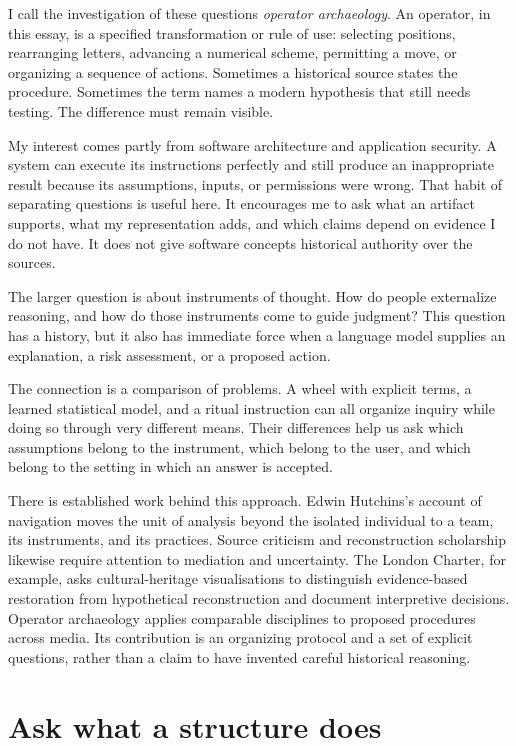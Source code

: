 \documentclass[11pt]{article}
\begin{document}
I call the investigation of these questions \emph{operator archaeology}.
An operator, in this essay, is a specified transformation or rule of use:
selecting positions, rearranging letters, advancing a numerical scheme,
permitting a move, or organizing a sequence of actions. Sometimes a historical
source states the procedure. Sometimes the term names a modern hypothesis
that still needs testing. The difference must remain visible.

My interest comes partly from software architecture and application security.
A system can execute its instructions perfectly and still produce an
inappropriate result because its assumptions, inputs, or permissions were
wrong. That habit of separating questions is useful here. It encourages me to
ask what an artifact supports, what my representation adds, and which claims
depend on evidence I do not have. It does not give software concepts historical
authority over the sources.

The larger question is about instruments of thought. How do people externalize
reasoning, and how do those instruments come to guide judgment? This question
has a history, but it also has immediate force when a language model supplies
an explanation, a risk assessment, or a proposed action.

The connection is a comparison of problems. A wheel with explicit terms, a
learned statistical model, and a ritual instruction can all organize inquiry
while doing so through very different means. Their differences help us ask
which assumptions belong to the instrument, which belong to the user, and
which belong to the setting in which an answer is accepted.

There is established work behind this approach. Edwin Hutchins's account of
navigation moves the unit of analysis beyond the isolated individual to a
team, its instruments, and its practices.\cite{hutchins} Source criticism and
reconstruction scholarship likewise require attention to mediation and
uncertainty. The London Charter, for example, asks cultural-heritage
visualisations to distinguish evidence-based restoration from hypothetical
reconstruction and document interpretive decisions.\cite{london}
Operator archaeology applies comparable disciplines to proposed procedures
across media. Its contribution is an organizing protocol and a set of explicit
questions, rather than a claim to have invented careful historical reasoning.

\section{Ask what a structure does}
\end{document}
